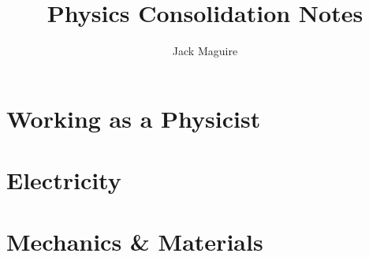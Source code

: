 \documentclass{report}
\title{\huge{Physics Consolidation Notes}}
\author{\huge{Jack Maguire}}
\date{}
\begin{document}
\maketitle

\tableofcontents
\pagebreak


\part{Working as a Physicist}


\part{Electricity}


\part{Mechanics \& Materials}

\end{document}
